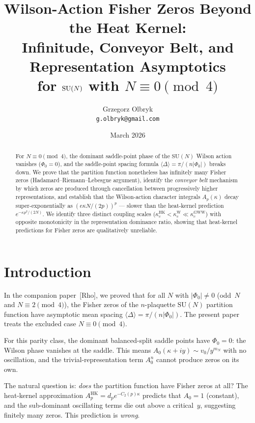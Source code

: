 \documentclass[12pt]{article}
\title{Wilson-Action Fisher Zeros Beyond the Heat Kernel:\\
Infinitude, Conveyor Belt, and Representation Asymptotics\\
for $\SU(N)$ with $N \equiv 0\!\pmod{4}$}
\author{Grzegorz Olbryk\\[-2pt]
\small\texttt{g.olbryk@gmail.com}}
\date{March 2026}
\theoremstyle{definition}
\theoremstyle{remark}
\newcommand{\SU}{\mathrm{SU}}
\newcommand{\avg}[1]{\langle #1 \rangle}
\begin{document}
\maketitle

\begin{abstract}
For $N \equiv 0\!\pmod{4}$, the dominant saddle-point phase of the
$\SU(N)$ Wilson action vanishes ($\Phi_0 = 0$), and the saddle-point
spacing formula $\avg{\Delta} = \pi/(n|\Phi_0|)$ breaks down.
We prove that the partition function nonetheless has infinitely many
Fisher zeros (Hadamard--Riemann--Lebesgue argument), identify the
\emph{conveyor belt} mechanism by which zeros are produced through
cancellation between progressively higher representations, and
establish that the Wilson-action character integrals $A_p(\kappa)$
decay super-exponentially as $(e\kappa N/(2p))^p$ --- slower than the
heat-kernel prediction $e^{-\kappa p^2/(2N)}$. We identify three
distinct coupling scales ($\kappa_c^{\mathrm{HK}} < \kappa_c^{\mathrm{W}}
\ll \kappa_c^{\mathrm{GWW}}$) with opposite monotonicity in the
representation dominance ratio, showing that heat-kernel predictions
for Fisher zeros are qualitatively unreliable.
\end{abstract}


\section{Introduction}

In the companion paper~[Rho], we proved that for all $N$ with
$|\Phi_0| \neq 0$ (odd~$N$ and $N \equiv 2\!\pmod{4}$), the Fisher
zeros of the $n$-plaquette $\SU(N)$ partition function have asymptotic
mean spacing $\avg{\Delta} = \pi/(n|\Phi_0|)$. The present paper treats
the excluded case $N \equiv 0\!\pmod{4}$.

For this parity class, the dominant balanced-split saddle points have
$\Phi_0 = 0$: the Wilson phase vanishes at the saddle. This means
$A_0(\kappa + iy) \sim v_0/y^{m_N}$ with no oscillation, and the
trivial-representation term $A_0^n$ cannot produce zeros on its own.

The natural question is: \emph{does} the partition function have Fisher
zeros at all? The heat-kernel approximation $A_p^{\mathrm{HK}} = d_p
e^{-C_2(p)\kappa}$ predicts that $A_0 = 1$ (constant), and the
sub-dominant oscillating terms die out above a critical~$y$, suggesting
finitely many zeros. This prediction is \emph{wrong}.
\end{document}
